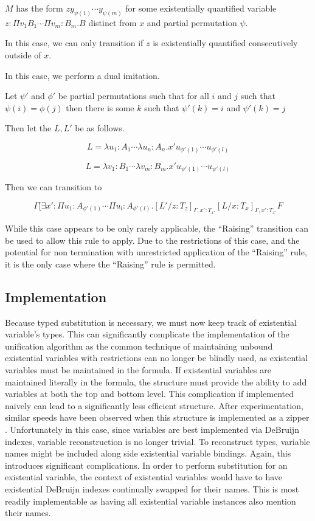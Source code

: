 $M$ has the form $z y_{\psi(1)} \cdots y_{\psi(m)}$
for some existentially quantified variable $z : \Pi v_1 B_1 \cdots \Pi v_m : B_m . B$ 
distinct from $x$ and partial permutation $\psi$. 

In this case, we can only transition if $z$ is existentially 
quantified consecutively outside of $x$.

In this case, we perform a dual imitation.

Let $\psi'$ and $\phi'$ be partial permutations 
such that for all $i$ and $j$ such that
$\psi(i) = \phi(j)$ then there is some $k$ such that
$\psi'(k) = i$ and $\psi'(k) = j$

Then let the $L,L'$ be as follows.

\[
L = \lambda u_1 : A_1 \cdots \lambda u_n : A_n . x' u_{\phi'(1)} \cdots u_{\phi'(l)}
\]

\[
L = \lambda v_1 : B_1 \cdots \lambda v_m : B_m . x' u_{\psi'(1)} \cdots u_{\psi'(l)}
\]

Then we can transition to

\[
\Gamma [ \exists x' : \Pi u_1 : A_{\phi'(1) } \cdots \Pi u_l : A_{\phi'(l)}
. [L'/z : T_z]_{\Gamma, x': T_{x'}}[L / x : T_x]_{\Gamma, x': T_{x'}} F
\]
 
While this case appears to be only rarely applicable,
the ``Raising'' transition can be used to allow this rule to apply.
Due to the restrictions of this case, and the potential
for non termination with unrestricted application of the ``Raising'' rule,
it is the only case where the ``Raising'' rule is permitted.  


\subsection{Implementation}

Because typed substitution is necessary, we must now keep track of existential variable's
types.  This can significantly complicate the implementation of the unification algorithm
as the common technique of maintaining unbound existential variables with restrictions
can no longer be blindly used, as existential variables must be maintained in the 
formula.  If existential variables are maintained literally in the formula, 
the structure must provide the ability to add variables at both the top and bottom level.
This complication if implemented naively can lead to a significantly less efficient structure.
After experimentation, similar speeds have been observed when this structure is implemented
as a zipper \citep{huet1997functional}.  Unfortunately in this case, since variables are best 
implemented via DeBruijn indexes, variable reconstruction is no longer trivial. 
To reconstruct types, variable names might be included along side existential variable bindings.  
Again, this introduces significant complications.  In order to perform 
substitution for an existential variable, the context of existential variables would have to have
existential DeBruijn indexes continually swapped for their names.  
This is most readily implementable as having all existential variable instances 
also mention their names.

